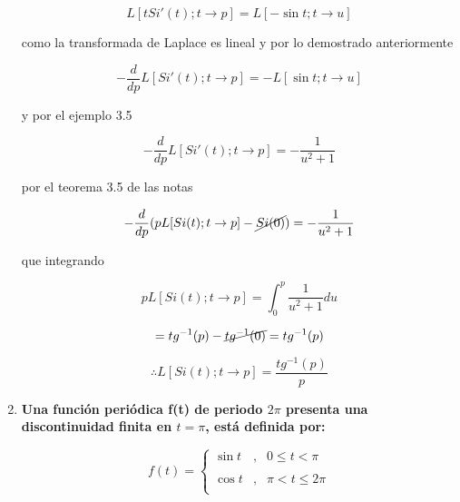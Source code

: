 \documentclass[12pt,a4paper]{article}
\begin{document}
\begin{enumerate}
    \begin{equation*}
        L[tSi'(t);t \rightarrow p]=L[-\sin{t};t \rightarrow u]
    \end{equation*}
    
    como la transformada de Laplace es lineal y por lo demostrado anteriormente
    
    \begin{equation*}
        -\frac{d}{dp}L[Si'(t);t \rightarrow p]=-L[\sin{t};t \rightarrow u]
    \end{equation*}
    
    y por el ejemplo 3.5
    
    \begin{equation*}
        -\frac{d}{dp}L[Si'(t);t \rightarrow p]=-\frac{1}{u^2+1}
    \end{equation*}
    
    por el teorema 3.5 de las notas
    
    \begin{equation*}
        -\frac{d}{dp}(pL[Si(t);t \rightarrow p]-\cancel{Si(0)})=-\frac{1}{u^2+1}
    \end{equation*}
    
    que integrando
    
    \begin{equation*}
        pL[Si(t);t \rightarrow p]=\int_{0}^{p}\frac{1}{u^2+1} du
    \end{equation*}
    
    
    \begin{equation*}
        =tg^{-1}(p)-\cancel{tg^{-1}(0)}=tg^{-1}(p)
    \end{equation*}
    
    \begin{equation*}
        \therefore L[Si(t);t \rightarrow p]=\frac{tg^{-1}(p)}{p}
    \end{equation*}
    
    
    
    
    
    \item \textbf{Una función periódica f(t) de periodo $2\pi$ presenta una discontinuidad finita en $t=\pi$, está definida por:}
    
    \begin{equation*}
        f(t)= \left\{ \begin{array}{lcc}
             \sin{t} &   ,  & 0 \leq t < \pi\\
             \\ \cos{t} &  , &  \pi < t \leq 2\pi \\
             \end{array}
        \right.
    \end{equation*}
    

\end{enumerate}
\end{document}
